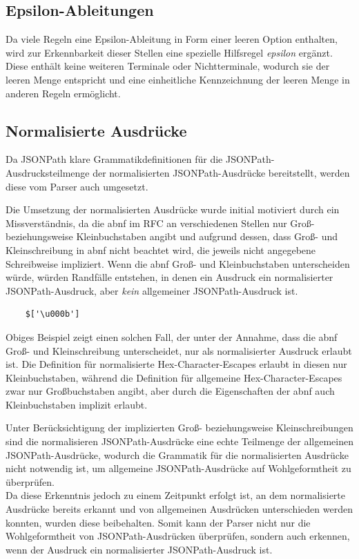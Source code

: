 \documentclass[oneside]{ausarbeitung}
\begin{document}
\subsection{Epsilon-Ableitungen}

Da viele Regeln eine Epsilon-Ableitung in Form einer leeren Option enthalten, wird zur Erkennbarkeit dieser Stellen eine spezielle Hilfsregel \textit{epsilon} ergänzt. Diese enthält keine weiteren Terminale oder Nichtterminale, wodurch sie der leeren Menge entspricht und eine einheitliche Kennzeichnung der leeren Menge in anderen Regeln ermöglicht.



\pagebreak

\subsection{Normalisierte Ausdrücke}

Da JSONPath klare Grammatikdefinitionen für die JSONPath-Ausdrucksteilmenge der normalisierten JSONPath-Ausdrücke bereitstellt, werden diese vom Parser auch umgesetzt. 

Die Umsetzung der normalisierten Ausdrücke wurde initial motiviert durch ein Missverständnis, da die \ac{abnf} im RFC an verschiedenen Stellen nur Groß- beziehungsweise Kleinbuchstaben angibt und aufgrund dessen, dass Groß- und Kleinschreibung in \ac{abnf} nicht beachtet wird, die jeweils nicht angegebene Schreibweise impliziert. Wenn die \ac{abnf} Groß- und Kleinbuchstaben unterscheiden würde, würden Randfälle entstehen, in denen ein Ausdruck ein normalisierter JSONPath-Ausdruck, aber \textit{kein} allgemeiner JSONPath-Ausdruck ist.

\begin{lstlisting}
	$['\u000b']
\end{lstlisting}

Obiges Beispiel zeigt einen solchen Fall, der unter der Annahme, dass die \ac{abnf} Groß- und Kleinschreibung unterscheidet, nur als normalisierter Ausdruck erlaubt ist. Die Definition für normalisierte Hex-Character-Escapes erlaubt in diesen nur Kleinbuchstaben, während die Definition für allgemeine Hex-Character-Escapes zwar nur Großbuchstaben angibt, aber durch die Eigenschaften der \ac{abnf} auch Kleinbuchstaben implizit erlaubt.

Unter Berücksichtigung der implizierten Groß- beziehungsweise Kleinschreibungen sind die normalisieren JSONPath-Ausdrücke eine echte Teilmenge der allgemeinen JSONPath-Ausdrücke, wodurch die Grammatik für die normalisierten Ausdrücke nicht notwendig ist, um allgemeine JSONPath-Ausdrücke auf Wohlgeformtheit zu überprüfen. \\
Da diese Erkenntnis jedoch zu einem Zeitpunkt erfolgt ist, an dem normalisierte Ausdrücke bereits erkannt und von allgemeinen Ausdrücken unterschieden werden konnten, wurden diese beibehalten. Somit kann der Parser nicht nur die Wohlgeformtheit von JSONPath-Ausdrücken überprüfen, sondern auch erkennen, wenn der Ausdruck ein normalisierter JSONPath-Ausdruck ist.
\end{document}
